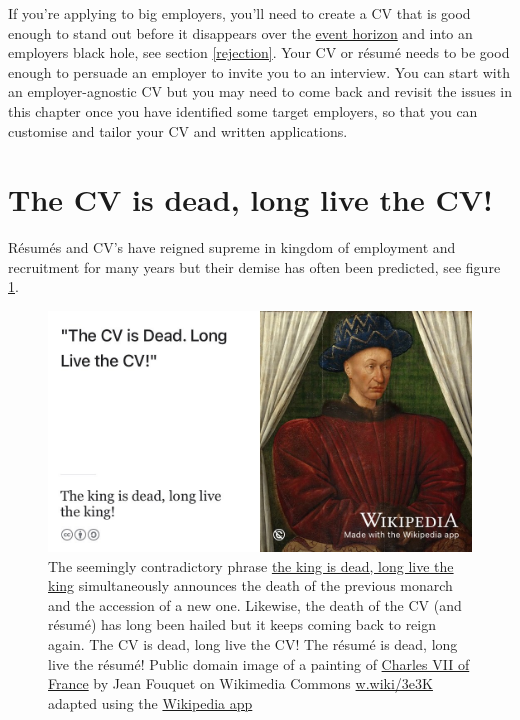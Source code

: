 \documentclass[
]{book}
\begin{document}
If you're applying to big employers, you'll need to create a CV that is good enough to stand out before it disappears over the \href{https://en.wikipedia.org/wiki/Event_horizon}{event horizon} and into an employers black hole, see section \ref{rejection}. Your CV or résumé needs to be good enough to persuade an employer to invite you to an interview. You can start with an employer-agnostic CV but you may need to come back and revisit the issues in this chapter once you have identified some target employers, so that you can customise and tailor your CV and written applications.

\hypertarget{dead}{%
\section{The CV is dead, long live the CV!}\label{dead}}

Résumés and CV's have reigned supreme in kingdom of employment and recruitment for many years but their demise has often been predicted, see figure \ref{fig:longlive-fig}.

\begin{figure}

{\centering \includegraphics[width=0.99\linewidth]{images/the-king-is-dead} 

}

\caption{The seemingly contradictory phrase \href{https://en.wikipedia.org/wiki/The_king_is_dead,_long_live_the_king!}{the king is dead, long live the king} simultaneously announces the death of the previous monarch and the accession of a new one. Likewise, the death of the CV (and résumé) has long been hailed but it keeps coming back to reign again. The CV is dead, long live the CV! The résumé is dead, long live the résumé! Public domain image of a painting of \href{https://en.wikipedia.org/wiki/Charles_VII_of_France}{Charles VII of France} by Jean Fouquet on Wikimedia Commons \href{https://w.wiki/3e3K}{w.wiki/3e3K} adapted using the \href{https://apps.apple.com/us/app/wikipedia/id324715238}{Wikipedia app}}\label{fig:longlive-fig}
\end{figure}
\end{document}
